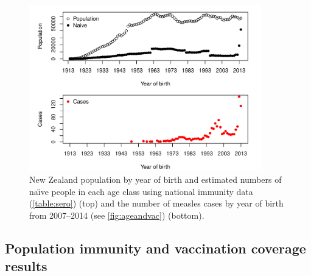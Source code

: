 \documentclass{article}
\begin{document}
\begin{figure}
\begin{center}
     \includegraphics[width=0.9\textwidth]{naive_allPop_yob.pdf}
\end{center}
\caption{New Zealand population by year of birth and estimated numbers of na\"{\i}ve people in each age class using national immunity data (\autoref{table:sero}) (top) and the number of measles cases by year of birth from 2007--2014 (see \autoref{fig:ageandvac}) (bottom).}
\label{fig:naive_yob}
\end{figure}

\subsection{Population immunity and vaccination coverage results}
\label{sub:popim}
\end{document}
